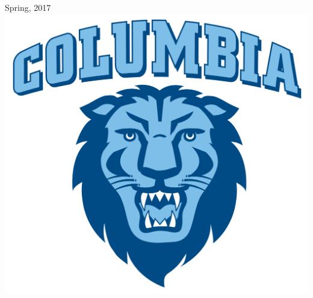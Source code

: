 \begin{titlepage}


	{\large Spring, 2017}\\[1cm] %


	\includegraphics[width=0.4\linewidth]{images/Columbia_Lions_Logo.png}\\[1cm] %


	\vfill %

\end{titlepage}




